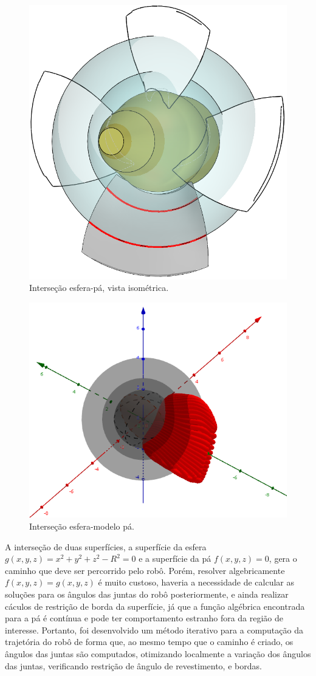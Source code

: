 \begin{figure}[!ht]
	\centering
	\includegraphics[width=.6\columnwidth]{figs/planejamento/intersecao_iso.PNG}
	\caption{Interseção esfera-pá, vista isométrica.}
	\label{fig::interiso}
\end{figure}

\begin{figure}[!ht]
	\centering
	\includegraphics[width=\columnwidth]{figs/planejamento/intersecao_geogebra.png}
	\caption{Interseção esfera-modelo pá.}
	\label{fig::intergeo}
\end{figure}

A interseção de duas superfícies, a superfície da esfera
$g(x,y,z)=x^2+y^2+z^2-R^2=0$ e a superfície da pá $f(x,y,z)=0$, gera o caminho
que deve ser percorrido pelo robô. Porém, resolver algebricamente
$f(x,y,z)=g(x,y,z)$ é muito custoso, haveria a necessidade de
calcular as soluções para os ângulos das juntas do robô posteriormente, e ainda
realizar cáculos de restrição de borda da superfície, já que a função algébrica
encontrada para a pá é contínua e pode ter comportamento estranho fora da
região de interesse. Portanto, foi desenvolvido um método iterativo para a
computação da trajetória do robô de forma que, ao mesmo tempo que o caminho é
criado, os ângulos das juntas são computados, otimizando localmente a variação
dos ângulos das juntas, verificando restrição de ângulo de revestimento, e
bordas.

